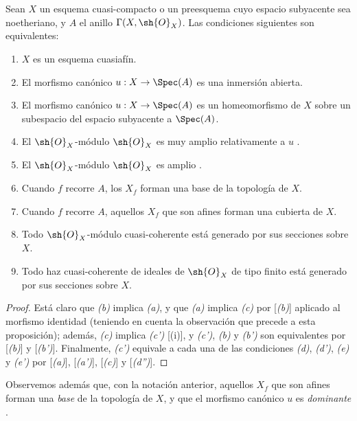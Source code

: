 \documentclass[oneside,10pt]{amsart}
\makeatletter
\newcommand{\ega@arrow}[2]{\mathchoice{#1}{#2}{#2}{#2}}
\renewcommand{\to}{\ega@arrow{\longrightarrow}{\rightarrow}}
\newcommand{\oldpage}[2][]{\marginnote{\normalfont\footnotesize\textbf{#1}~|~#2}\ignorespaces}
\let\EGAOriginalLabel\label
\renewcommand{\label}[1]{\phantomsection\EGAOriginalLabel{#1}}
\makeatother
\begin{document}
\begin{proposition}[5.1.2]
\label{II.5.1.2}
Sean $X$ un esquema cuasi-compacto o un preesquema cuyo espacio subyacente sea noetheriano, y $A$ el anillo $\Gamma(X,\sh{O}_X)$.
Las condiciones siguientes son equivalentes:
\begin{enumerate}
  \item[{\rm(a)}] $X$ es un esquema cuasiafín.
  \item[{\rm(b)}] El morfismo canónico $u:X\to\Spec(A)$ es una inmersión abierta.
  \item[{\rm(b')}] El morfismo canónico $u:X\to\Spec(A)$ es un homeomorfismo de $X$ sobre un subespacio del espacio subyacente a $\Spec(A)$.
  \item[{\rm(c)}] El $\sh{O}_X$-módulo $\sh{O}_X$ es muy amplio relativamente a $u$ .
  \item[{\rm(c')}] El $\sh{O}_X$-módulo $\sh{O}_X$ es amplio .
  \item[{\rm(d)}] Cuando $f$ recorre $A$, los $X_f$ forman una base de la topología de $X$.
  \item[{\rm(d')}] Cuando $f$ recorre $A$, aquellos $X_f$ que son afines forman una cubierta de $X$.
\oldpage[II]{95}
  \item[{\rm(e)}] Todo $\sh{O}_X$-módulo cuasi-coherente está generado por sus secciones sobre $X$.
  \item[{\rm(e')}] Todo haz cuasi-coherente de ideales de $\sh{O}_X$ de tipo finito está generado por sus secciones sobre $X$.
\end{enumerate}
\end{proposition}

\begin{proof}
Está claro que \emph{(b)} implica \emph{(a)}, y que \emph{(a)} implica \emph{(c)} por [\emph{(b)}] aplicado al morfismo identidad (teniendo en cuenta la observación que precede a esta proposición);
además, \emph{(c)} implica \emph{(c')} [(i)], y \emph{(c')}, \emph{(b)} y \emph{(b')} son equivalentes por [\emph{(b)}] y [\emph{(b')}].
Finalmente, \emph{(c')} equivale a cada una de las condiciones \emph{(d)}, \emph{(d')}, \emph{(e)} y \emph{(e')} por [\emph{(a)}], [\emph{(a')}], [\emph{(c)}] y [\emph{(d'')}].
\end{proof}

Observemos además que, con la notación anterior, aquellos $X_f$ que son afines forman una \emph{base} de la topología de $X$, y que el morfismo canónico $u$ es \emph{dominante} .
\end{document}
